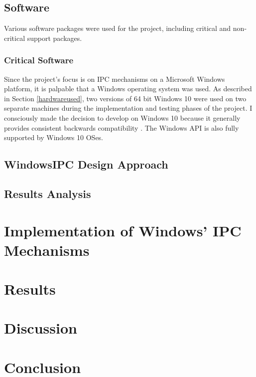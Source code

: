 \documentclass[12pt] {newrucsthesis}    %
\begin{document}
    \section{Software} \label{softwareused}%
      Various software packages were used for the project, including critical and
      non-critical support packages.
        \subsection{Critical Software}
          Since the project's focus is on IPC mechanisms on a Microsoft Windows
          platform, it is palpable that a Windows operating system was used. As described in
          Section \ref{hardwareused}, two versions of 64 bit Windows 10 were used on two separate
          machines during the implementation and testing phases of the project. I consciously made
          the decision to develop on Windows 10 because it generally provides
          consistent backwards compatibility \citep{win10BC}. The Windows API is also fully supported
          by Windows 10 OSes.

    \section{WindowsIPC Design Approach} \label{devapproach}
    \section{Results Analysis} \label{results}

  \chapter{Implementation of Windows' IPC Mechanisms}

  \chapter{Results}

  \chapter{Discussion}

  \chapter{Conclusion}


\end{document}
